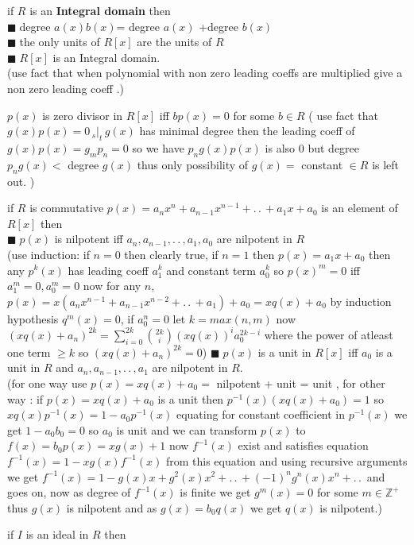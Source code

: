 \documentclass[11pt]{extarticle}
\newcommand{\Z}{\mathbb{Z}}
\newcommand{\ck}{.\,.\,}
\newcommand{\snote}[1]{{\footnotesize(#1)}}
\newcommand{\st}{\,{}_{s}|_t\,}
\newcommand{\tbx}[2][]{
	\begin{tcolorbox}[enhanced,breakable,size=small,colback=black!2!white,title={#1},arc is angular, arc=1.5mm,drop fuzzy shadow]
		#2
	\end{tcolorbox}
}
\newcommand{\y}{$\blacksquare\;$}
\begin{document}
\begin{multicols}{2}
\tbx{ if 	$ R $ is an \textbf{Integral domain }then  \\
			\y degree $ a(x)b(x) $= degree $ a(x) $ +degree $b(x)$ \\
			\y the only units of $ R[x] $ are the units of $ R $ \\
			\y $ R[x] $ is an Integral domain. \\
			\snote{use fact that when polynomial with non zero leading coeffs are multiplied give a non zero leading coeff .}
			} 
\tbx{$ p(x) $ is zero divisor in $ R[x] $ iff $ bp(x)=0 $ for some $ b\in R $ 
			\snote{ use fact that $ g(x)p(x)=0 \st g(x) $ has minimal degree then the leading coeff of $ g(x)p(x)= g_mp_n=0 $ so we have $ p_ng(x)p(x)$ is also $0 $ but degree $ p_ng(x) <$ degree $ g(x)$ thus only possibility of $ g(x)= $ constant $ \in R $ is left out.  }
			} 
\tbx{if $ R $ is commutative $ p(x)=a_nx^n+a_{n-1}x^{n-1}+\ck +a_1 x+a_0 $ is an element of $ R[x] $ then\\
			\y $ p(x) $ is nilpotent iff $ a_n , a_{n-1},\ck , a_1,a_0$ are nilpotent in $ R $  \\
			\snote{use induction: if $ n=0 $ then clearly true, if $ n=1 $ then $ p(x)=a_1x+a_0 $ then any $ p^k(x) $ has leading coeff $ a_1^k $ and constant term $ a_0^k $ so $ p(x)^m=0 $ iff $a_1^m=0,a_0^m=0 $ now for any $ n $, $ p(x)=x(a_nx^{n-1}+a_{n-1}x^{n-2}+\ck +a_1)+a_0 =xq(x)+a_0$ by induction hypothesis $ q^m(x)=0 $, if $ a_0^n=0 $ let $ k=max(n,m) $ now $ (xq(x)+a_n)^{2k}=\sum_{i=0}^{2k} {2k\choose i } (xq(x))^{i}a_0^{2k-i} $ where the power of atleast one term $ \geq k $ so $ (xq(x)+a_n)^{2k} =0 $}
			\y $ p(x) $ is a unit in $ R[x] $ iff $ a_0 $ is a unit in $ R $ and $ a_n,a_{n-1},\ck, a_1 $ are nilpotent in $ R. $ \\
			\snote{for one way use $ p(x)=xq(x)+a_0= $ nilpotent + unit = unit , for other way : if $ p(x) = x q(x)+a_0$ is a unit then 
				$ p^{-1}(x)(xq(x)+a_0)=1 $ so $ xq(x)p^{-1}(x)=1-a_0p^{-1}(x) $ equating for constant coefficient in  $ p^{-1}(x)$ we get $ 1-a_0b_0=0 $ so $ a_0 $ is unit and we can transform $ p(x) $ to $ f(x)=b_0p(x)=xg(x)+1 $  now $ f^{-1}(x) $ exist and satisfies equation $ f^{-1}(x)=1-xg(x)f^{-1}(x) $ from this equation and using recursive arguments we get $ f^{-1}(x)=1-g(x)x+g^2(x)x^2+\ck +(-1)^{n}g^n(x)x^n+\ck $ and goes on, now as degree of $ f^{-1}(x) $ is finite we get $ g^m(x)=0 $ for some $ m\in \Z^+ $ thus $ g(x) $ is nilpotent and as $ g(x)=b_0q(x) $ we get $ q(x) $ is nilpotent.} 
			} 
\tbx[Ideals in Polynomial rings ]{if $ I $ is an ideal in $ R $ then\\
}
\end{multicols}
\end{document}

